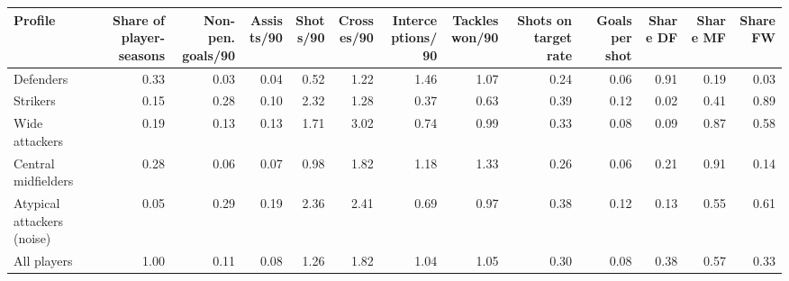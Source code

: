 \begin{tabular}{lrrrrrrrrrrrr}
\toprule
Profile & Share of player-seasons & Non-pen. goals/90 & Assists/90 & Shots/90 & Crosses/90 & Interceptions/90 & Tackles won/90 & Shots on target rate & Goals per shot & Share DF & Share MF & Share FW \\
\midrule
Defenders & 0.33 & 0.03 & 0.04 & 0.52 & 1.22 & 1.46 & 1.07 & 0.24 & 0.06 & 0.91 & 0.19 & 0.03 \\
Strikers & 0.15 & 0.28 & 0.10 & 2.32 & 1.28 & 0.37 & 0.63 & 0.39 & 0.12 & 0.02 & 0.41 & 0.89 \\
Wide attackers & 0.19 & 0.13 & 0.13 & 1.71 & 3.02 & 0.74 & 0.99 & 0.33 & 0.08 & 0.09 & 0.87 & 0.58 \\
Central midfielders & 0.28 & 0.06 & 0.07 & 0.98 & 1.82 & 1.18 & 1.33 & 0.26 & 0.06 & 0.21 & 0.91 & 0.14 \\
Atypical attackers (noise) & 0.05 & 0.29 & 0.19 & 2.36 & 2.41 & 0.69 & 0.97 & 0.38 & 0.12 & 0.13 & 0.55 & 0.61 \\
All players & 1.00 & 0.11 & 0.08 & 1.26 & 1.82 & 1.04 & 1.05 & 0.30 & 0.08 & 0.38 & 0.57 & 0.33 \\
\bottomrule
\end{tabular}
